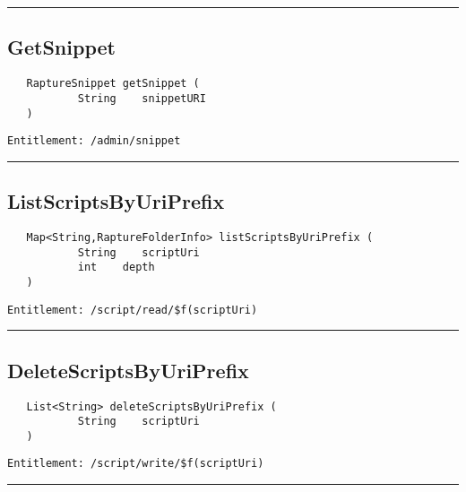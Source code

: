 \rule{12cm}{2pt}
\subsection{GetSnippet}
\label{Api:GetSnippet}
\begin{Verbatim}
   RaptureSnippet getSnippet (
           String    snippetURI
   )
\end{Verbatim}
\begin{Verbatim}[formatcom=\color{Maroon}]
  Entitlement: /admin/snippet
\end{Verbatim}



\rule{12cm}{2pt}
\subsection{ListScriptsByUriPrefix}
\label{Api:ListScriptsByUriPrefix}
\begin{Verbatim}
   Map<String,RaptureFolderInfo> listScriptsByUriPrefix (
           String    scriptUri
           int    depth
   )
\end{Verbatim}
\begin{Verbatim}[formatcom=\color{Maroon}]
  Entitlement: /script/read/$f(scriptUri)
\end{Verbatim}



\rule{12cm}{2pt}
\subsection{DeleteScriptsByUriPrefix}
\label{Api:DeleteScriptsByUriPrefix}
\begin{Verbatim}
   List<String> deleteScriptsByUriPrefix (
           String    scriptUri
   )
\end{Verbatim}
\begin{Verbatim}[formatcom=\color{Maroon}]
  Entitlement: /script/write/$f(scriptUri)
\end{Verbatim}



\rule{12cm}{2pt}
